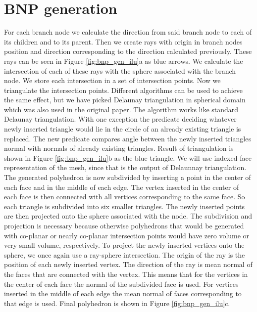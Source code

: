 \section{BNP generation}\label{sec:bnp_gen}
For each branch node we calculate the direction from said branch node to each of its children and to its parent. Then we create rays with origin in branch nodes position and direction corresponding to the direction calculated previously. These rays can be seen in Figure \ref{fig:bnp_gen_ilu}a as blue arrows. We calculate the intersection of each of these rays with the sphere associated with the branch node. We store each intersection in a set of intersection points. Now we triangulate the intersection points. Different algorithms can be used to achieve the same effect, but we have picked Delaunay triangulation in spherical domain which was also used in the original paper. The algorithm works like standard Delaunay triangulation. With one exception the predicate deciding whatever newly inserted triangle would lie in the circle of an already existing triangle is replaced. The new predicate compares angle between the newly inserted triangles normal with normals of already existing triangles. Result of triangulation is shown in Figure \ref{fig:bnp_gen_ilu}b as the blue triangle. We will use indexed face representation of the mesh, since that is the output of Delaunnay triangulation. The generated polyhedron is now subdivided by inserting a point in the center of each face and in the middle of each edge. The vertex inserted in the center of each face is then connected with all vertices corresponding to the same face. So each triangle is subdivided into six smaller triangles. The newly inserted points are then projected onto the sphere associated with the node. The subdivision and projection is necessary because otherwise polyhedrons that would be generated with co-planar or nearly co-planar intersection points would have zero volume or very small volume, respectively. To project the newly inserted vertices onto the sphere, we once again use a ray-sphere intersection. The origin of the ray is the position of each newly inserted vertex. The direction of the ray is mean normal of the faces that are connected with the vertex. This means that for the vertices in the center of each face the normal of the subdivided face is used. For vertices inserted in the middle of each edge the mean normal of faces corresponding to that edge is used. Final polyhedron is shown in Figure \ref{fig:bnp_gen_ilu}c.

